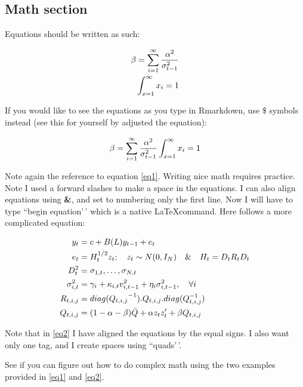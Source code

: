 \documentclass[11pt,preprint, authoryear]{elsarticle}
\numberwithin{equation}{section}
\numberwithin{figure}{section}
\numberwithin{table}{section}
\begin{document}
\hypertarget{math-section}{%
\subsection{Math section}\label{math-section}}

Equations should be written as such:

\begin{align}
\beta = \sum_{i = 1}^{\infty}\frac{\alpha^2}{\sigma_{t-1}^2} \label{eq1} \\
\int_{x = 1}^{\infty}x_{i} = 1 \notag
\end{align}

If you would like to see the equations as you type in Rmarkdown, use \$
symbols instead (see this for yourself by adjusted the equation):

\[
\beta = \sum_{i = 1}^{\infty}\frac{\alpha^2}{\sigma_{t-1}^2} \\
\int_{x = 1}^{\infty}x_{i} = 1
\]

Note again the reference to equation \ref{eq1}. Writing nice math
requires practice. Note I used a forward slashes to make a space in the
equations. I can also align equations using \textbf{\&}, and set to
numbering only the first line. Now I will have to type ``begin
equation'\,' which is a native \LaTeX command. Here follows a more
complicated equation:

\begin{align}
    y_t &= c + B(L) y_{t-1} + e_t   \label{eq2}    \\ \notag
    e_t &= H_t^{1/2}  z_t ; \quad z_t \sim  N(0,I_N) \quad \& \quad H_t = D_tR_tD_t \\ \notag
        D_t^2 &= {\sigma_{1,t}, \dots, \sigma_{N,t}}   \\ \notag
        \sigma_{i,t}^2 &= \gamma_i+\kappa_{i,t}  v_{i, t-1}^2 +\eta_i  \sigma_{i, t-1}^2, \quad \forall i \\ \notag
        R_{t, i, j} &= {diag(Q_{t, i, j}}^{-1}) . Q_{t, i, j} . diag(Q_{t, i, j}^{-1})  \\ \notag
        Q_{t, i, j} &= (1-\alpha-\beta)  \bar{Q} + \alpha  z_t  z_t'  + \beta  Q_{t, i, j} \notag
\end{align}

Note that in \ref{eq2} I have aligned the equations by the equal signs.
I also want only one tag, and I create spaces using ``quads'\,'.

See if you can figure out how to do complex math using the two examples
provided in \ref{eq1} and \ref{eq2}.
\end{document}
